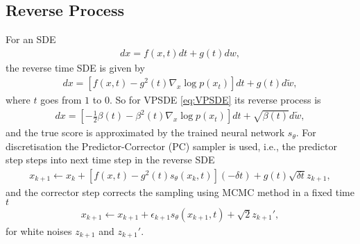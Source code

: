 \documentclass[12pt]{report}
\begin{document}
\subsection{Reverse Process}
For an SDE
\begin{align*}
    dx=f(x,t)dt+g(t)dw,
\end{align*}
the reverse time SDE is given by \cite{andersonReversetimeDiffusionEquation1982}
\begin{align*}
    dx=\left[f(x,t)-g^2(t)\nabla_{x}\log p\left(x_t\right)\right]dt+g\left(t\right)d\tilde{w},
\end{align*}
where \(t\) goes from \(1\) to \(0\). So for VPSDE \eqref{eq:VPSDE} its reverse process is
\begin{align*}
    dx=\left[-\frac{1}{2}\beta(t)-\beta^2(t)\nabla_{x}\log p\left(x_t\right)\right]dt+\sqrt{\beta(t)}d\tilde{w},
\end{align*}
and the true score is approximated by the trained neural network \(s_{\theta}\). For discretisation the Predictor-Corrector (PC) sampler \cite{song2020score} is used, i.e., the predictor step steps into next time step in the reverse SDE
\begin{align*}
    x_{k+1}\gets x_k+\left[f(x,t)-g^2(t)s_\theta\left(x_k, t\right)\right]\left(-\delta t\right)+g\left(t\right)\sqrt{\delta t}z_{k+1},
\end{align*}
and the corrector step corrects the sampling using MCMC method in a fixed time \(t\)
\begin{align*}
    x_{k+1}\gets x_{k+1}+\epsilon_{k+1}s_{\theta}\left(x_{k+1},t\right)+\sqrt{2}z_{k+1}',
\end{align*}
for white noises \(z_{k+1}\) and \(z_{k+1}'\).
\end{document}
